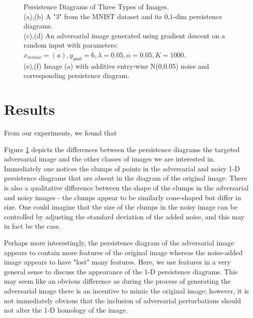 \documentclass[twoside,twocolumn]{article}
\begin{document}
\begin{figure}[!htb]
	\caption{Persistence Diagrams of Three Types of Images.\\
	(a),(b) A "3" from the MNIST dataset and its 0,1-dim persistence diagrams. \\
	(c),(d) An adversarial image generated using gradient descent on a random input with parameters:\\
	    \-\hspace{1em} $x_{mimic} = (a), y_{goal} = 6, \lambda = 0.05, \alpha = 0.05, K = 1000$. 
	\\
	(e),(f) Image (a) with additive entry-wise N(0,0.05) noise and corresponding persistence diagram.}
	\label{fig:targetedcomparison}
\end{figure}

\section{Results}

From our experiments, we found that


Figure \ref{fig:targetedcomparison} depicts the differences between the persistence diagrams the targeted adversarial image and the other classes of images we are interested in. Immediately one notices the clumps of points in the adversarial and noisy 1-D persistence diagrams that are absent in the diagram of the original image. There is also a qualitative difference between the shape of the clumps in the adversarial and noisy images - the clumps appear to be similarly cone-shaped but differ in size. One could imagine that the size of the clumps in the noisy image can be controlled by adjusting the standard deviation of the added noise, and this may in fact be the case. 

Perhaps more interestingly, the persistence diagram of the adversarial image appears to contain more features of the original image whereas the noise-added image appears to have "lost" many features. Here, we use features in a very general sense to discuss the appearance of the 1-D persistence diagrams. This may seem like an obvious difference as during the process of generating the adversarial image there is an incentive to mimic the original image; however, it is not immediately obvious that the inclusion of adversarial perturbations should not alter the 1-D homology of the image.
\end{document}
